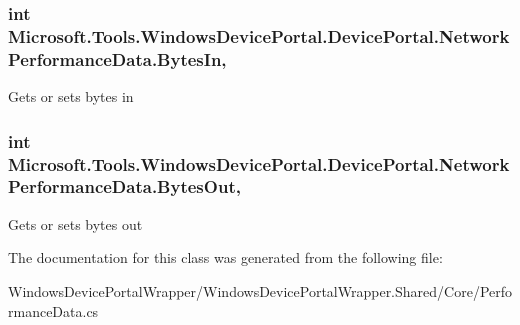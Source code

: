 \subsubsection[{\texorpdfstring{Bytes\+In}{BytesIn}}]{\setlength{\rightskip}{0pt plus 5cm}int Microsoft.\+Tools.\+Windows\+Device\+Portal.\+Device\+Portal.\+Network\+Performance\+Data.\+Bytes\+In\hspace{0.3cm}{\ttfamily [get]}, {\ttfamily [set]}}\hypertarget{class_microsoft_1_1_tools_1_1_windows_device_portal_1_1_device_portal_1_1_network_performance_data_a2ce7d300110e464ec98d3252ecb3e91c}{}\label{class_microsoft_1_1_tools_1_1_windows_device_portal_1_1_device_portal_1_1_network_performance_data_a2ce7d300110e464ec98d3252ecb3e91c}


Gets or sets bytes in 

\subsubsection[{\texorpdfstring{Bytes\+Out}{BytesOut}}]{\setlength{\rightskip}{0pt plus 5cm}int Microsoft.\+Tools.\+Windows\+Device\+Portal.\+Device\+Portal.\+Network\+Performance\+Data.\+Bytes\+Out\hspace{0.3cm}{\ttfamily [get]}, {\ttfamily [set]}}\hypertarget{class_microsoft_1_1_tools_1_1_windows_device_portal_1_1_device_portal_1_1_network_performance_data_a1d86b2d5d243e94379c9c8ac9259f624}{}\label{class_microsoft_1_1_tools_1_1_windows_device_portal_1_1_device_portal_1_1_network_performance_data_a1d86b2d5d243e94379c9c8ac9259f624}


Gets or sets bytes out 



The documentation for this class was generated from the following file\+:\begin{DoxyCompactItemize}
\item 
Windows\+Device\+Portal\+Wrapper/\+Windows\+Device\+Portal\+Wrapper.\+Shared/\+Core/Performance\+Data.\+cs\end{DoxyCompactItemize}
